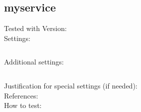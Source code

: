 \subsection{myservice}


\begin{description}
\item[Tested with Version:]


\item[Settings:] \mbox{}

\begin{lstlisting}[breaklines]
	%Here goes your setting string
\end{lstlisting}

\item[Additional settings:]


\begin{lstlisting}[breaklines]
	%copy \& paste additional settings
\end{lstlisting}

\item[Justification for special settings (if needed):]


\item[References:]



\item[How to test:]


\end{description}


